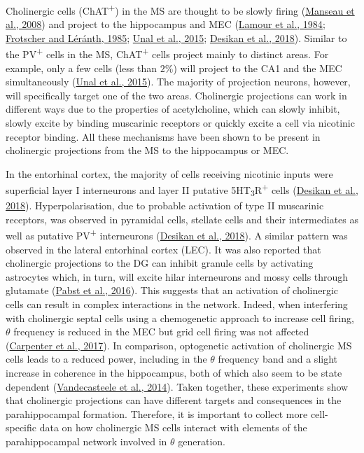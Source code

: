 \documentclass[
  12pt,
  a4paper,
  openany]{book}
\begin{document}
Cholinergic cells (ChAT\textsuperscript{+}) in the MS are thought to be slowly firing (\protect\hyperlink{ref-manseau_hippocamposeptal_2008}{Manseau et al., 2008}) and project to the hippocampus and MEC (\protect\hyperlink{ref-lamour_septo-hippocampal_1984}{Lamour et al., 1984}; \protect\hyperlink{ref-frotscher_cholinergic_1985}{Frotscher and Léránth, 1985}; \protect\hyperlink{ref-unal_synaptic_2015}{Unal et al., 2015}; \protect\hyperlink{ref-desikan_target_2018}{Desikan et al., 2018}). Similar to the PV\textsuperscript{+} cells in the MS, ChAT\textsuperscript{+} cells project mainly to distinct areas. For example, only a few cells (less than \(2\%\)) will project to the CA1 and the MEC simultaneously (\protect\hyperlink{ref-unal_synaptic_2015}{Unal et al., 2015}). The majority of projection neurons, however, will specifically target one of the two areas. Cholinergic projections can work in different ways due to the properties of acetylcholine, which can slowly inhibit, slowly excite by binding muscarinic receptors or quickly excite a cell via nicotinic receptor binding. All these mechanisms have been shown to be present in cholinergic projections from the MS to the hippocampus or MEC.

In the entorhinal cortex, the majority of cells receiving nicotinic inputs were superficial layer I interneurons and layer II putative 5HT\textsubscript{3}R\textsuperscript{+} cells (\protect\hyperlink{ref-desikan_target_2018}{Desikan et al., 2018}). Hyperpolarisation, due to probable activation of type II muscarinic receptors, was observed in pyramidal cells, stellate cells and their intermediates as well as putative PV\textsuperscript{+} interneurons (\protect\hyperlink{ref-desikan_target_2018}{Desikan et al., 2018}). A similar pattern was observed in the lateral entorhinal cortex (LEC). It was also reported that cholinergic projections to the DG can inhibit granule cells by activating astrocytes which, in turn, will excite hilar interneurons and mossy cells through glutamate (\protect\hyperlink{ref-pabst_astrocyte_2016}{Pabst et al., 2016}). This suggests that an activation of cholinergic cells can result in complex interactions in the network. Indeed, when interfering with cholinergic septal cells using a chemogenetic approach to increase cell firing, \(\theta\) frequency is reduced in the MEC but grid cell firing was not affected (\protect\hyperlink{ref-carpenter_modulating_2017}{Carpenter et al., 2017}). In comparison, optogenetic activation of cholinergic MS cells leads to a reduced power, including in the \(\theta\) frequency band and a slight increase in coherence in the hippocampus, both of which also seem to be state dependent (\protect\hyperlink{ref-vandecasteele_optogenetic_2014}{Vandecasteele et al., 2014}). Taken together, these experiments show that cholinergic projections can have different targets and consequences in the parahippocampal formation. Therefore, it is important to collect more cell-specific data on how cholinergic MS cells interact with elements of the parahippocampal network involved in \(\theta\) generation.
\end{document}
